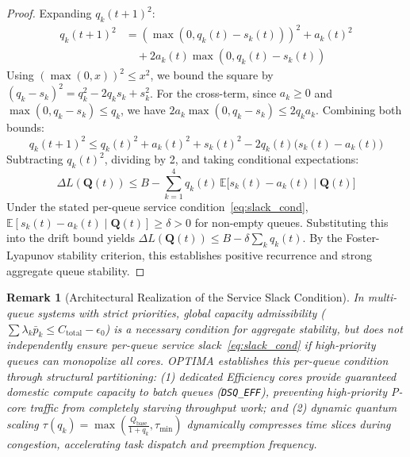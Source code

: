 \documentclass[conference]{IEEEtran}
\newtheorem{remark}{Remark}
\begin{document}
\begin{proof}
Expanding $q_k(t+1)^2$:
\begin{align}
q_k(t+1)^2 &= \left(\max(0, q_k(t) - s_k(t))\right)^2 + a_k(t)^2 \nonumber \\
&\quad + 2 a_k(t) \max(0, q_k(t) - s_k(t))
\end{align}
Using $(\max(0, x))^2 \le x^2$, we bound the square by $(q_k - s_k)^2 = q_k^2 - 2q_k s_k + s_k^2$. For the cross-term, since $a_k \ge 0$ and $\max(0, q_k - s_k) \le q_k$, we have $2 a_k \max(0, q_k - s_k) \le 2 q_k a_k$. Combining both bounds:
\begin{equation}
q_k(t+1)^2 \le q_k(t)^2 + a_k(t)^2 + s_k(t)^2 - 2 q_k(t)\big(s_k(t) - a_k(t)\big)
\end{equation}
Subtracting $q_k(t)^2$, dividing by 2, and taking conditional expectations:
\begin{equation}
\Delta L(\mathbf{Q}(t)) \le B - \sum_{k=1}^4 q_k(t) \, \mathbb{E}\big[ s_k(t) - a_k(t) \;\big|\; \mathbf{Q}(t) \big]
\end{equation}
Under the stated per-queue service condition~\eqref{eq:slack_cond}, $\mathbb{E}[s_k(t) - a_k(t) \mid \mathbf{Q}(t)] \ge \delta > 0$ for non-empty queues. Substituting this into the drift bound yields $\Delta L(\mathbf{Q}(t)) \le B - \delta \sum_k q_k(t)$. By the Foster-Lyapunov stability criterion, this establishes positive recurrence and strong aggregate queue stability.
\end{proof}

\begin{remark}[Architectural Realization of the Service Slack Condition]
In multi-queue systems with strict priorities, global capacity admissibility ($\sum \lambda_k \bar{p}_k \le C_{\mathrm{total}} - \epsilon_0$) is a necessary condition for aggregate stability, but does not independently ensure per-queue service slack~\eqref{eq:slack_cond} if high-priority queues can monopolize all cores. OPTIMA establishes this per-queue condition through structural partitioning:
(1) dedicated Efficiency cores provide guaranteed domestic compute capacity to batch queues (\texttt{DSQ\_EFF}), preventing high-priority P-core traffic from completely starving throughput work; and
(2) dynamic quantum scaling $\tau(q_k) = \max(\frac{Q_{\mathrm{base}}}{1+q_k}, \tau_{\min})$ dynamically compresses time slices during congestion, accelerating task dispatch and preemption frequency.
\end{remark}
\end{document}
